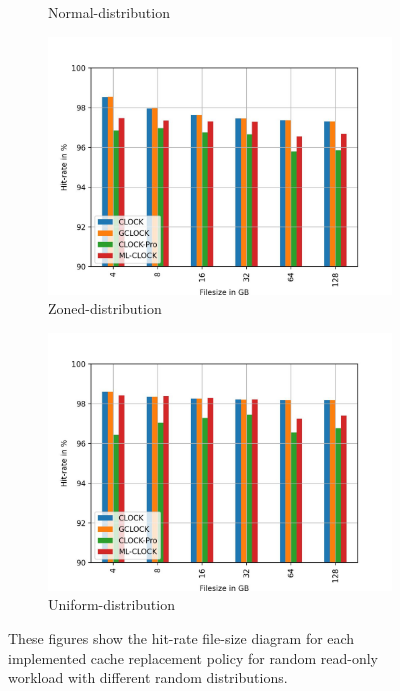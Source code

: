 \documentclass[
	12pt,
	a4paper,
	abstract,
	bibliography=totoc,
	chapterprefix,
	headings=openright,
	numbers=endperiod,
	parskip=half,
	twoside,
]{scrreprt}
\begin{document}
\begin{figure}[H]
\begin{subfigure}{0.4\textwidth}
		\caption{Normal-distribution}
		\label{fig:randread normal}
	\end{subfigure}
	\hfill
	\begin{subfigure}{0.4\textwidth}
		\includegraphics[width=\textwidth]{randread_zoned.jpg}		
		\caption{Zoned-distribution}
		\label{fig:randread zoned}
	\end{subfigure}
	\hfill
	\begin{subfigure}{0.4\textwidth}
		\includegraphics[width=\textwidth]{randread_uniform.jpg}		
		\caption{Uniform-distribution}
		\label{fig:randread uniform}
	\end{subfigure}
	\caption{These figures show the hit-rate file-size diagram for each implemented cache replacement policy for random read-only workload with different 				random distributions.}
	\label{fig:single 100p read}
\end{figure}
\end{document}
